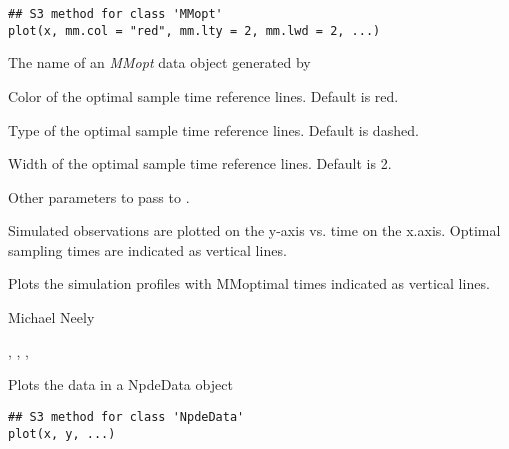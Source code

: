 \documentclass[a4paper]{book}
\begin{document}
%
\begin{Usage}
\begin{verbatim}
## S3 method for class 'MMopt'
plot(x, mm.col = "red", mm.lty = 2, mm.lwd = 2, ...)
\end{verbatim}
\end{Usage}
%
\begin{Arguments}
\begin{ldescription}
\item[\code{x}] The name of an \emph{MMopt} data object generated by 

\item[\code{mm.col}] Color of the optimal sample time reference lines.  Default is red.

\item[\code{mm.lty}] Type of the optimal sample time reference lines.  Default is dashed.

\item[\code{mm.lwd}] Width of the optimal sample time reference lines.  Default is 2.

\item[\code{...}] Other parameters to pass to .
\end{ldescription}
\end{Arguments}
%
\begin{Details}\relax
Simulated observations are plotted on the y-axis vs. time on the x.axis.  
Optimal sampling times are indicated as vertical lines.
\end{Details}
%
\begin{Value}
Plots the simulation profiles with MMoptimal times indicated as vertical lines.
\end{Value}
%
\begin{Author}\relax
Michael Neely
\end{Author}
%
\begin{SeeAlso}\relax
{}, , , 
\end{SeeAlso}
%
\begin{Description}\relax
Plots the data in a NpdeData object
\end{Description}
%
\begin{Usage}
\begin{verbatim}
## S3 method for class 'NpdeData'
plot(x, y, ...)
\end{verbatim}
\end{Usage}
\end{document}
